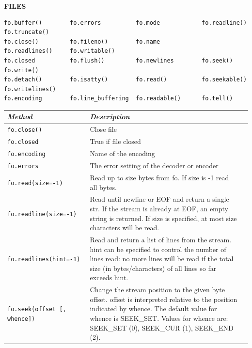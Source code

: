 \documentclass[9pt,a4wide]{extarticle}
\begin{document}
\bigskip
{\LARGE\bf FILES}
{}

\begin{verbatim}
fo.buffer()        fo.errors          fo.mode            fo.readline()      fo.truncate()
fo.close()         fo.fileno()        fo.name            fo.readlines()     fo.writable()
fo.closed          fo.flush()         fo.newlines        fo.seek()          fo.write()
fo.detach()        fo.isatty()        fo.read()          fo.seekable()      fo.writelines()
fo.encoding        fo.line_buffering  fo.readable()      fo.tell()            
\end{verbatim}

\medskip

\begin{supertabular}{|l|p{12cm}|c|}\hline
{\em Method}  & {\em Description}            \\ \hline\hline

{\tt fo.close()}  &  Close file  \\ \hline

{\tt fo.closed}  &  True if file closed  \\ \hline

{\tt fo.encoding}  & Name of the encoding   \\ \hline

{\tt fo.errors}  & The error setting of the decoder or encoder   \\ \hline

{\tt fo.read(size=-1)} & Read up to size bytes from fo. If size is -1 read  
 all bytes. \\ \hline

{\tt fo.readline(size=-1)} & Read until newline or EOF and return a single str. If the stream is already at EOF, an empty string is returned. If size is specified, at most size characters will be read.  \\ \hline

{\tt fo.readlines(hint=-1)} & Read and return a list of lines from the stream. hint can be specified to control the number of lines read: no more lines will be read if the total size (in bytes/characters) of all lines so far exceeds hint.  \\ \hline

{\tt fo.seek(offset [, whence]) } & Change the stream position to the given
byte offset. offset is interpreted relative to the position indicated by
whence. The default value for whence is SEEK\_SET. Values for whence are:
SEEK\_SET (0), SEEK\_CUR (1), SEEK\_END (2).\\ \hline


\end{supertabular}
\end{document}

